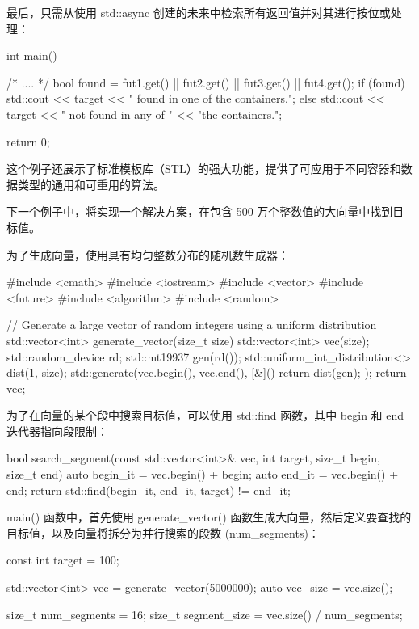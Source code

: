 最后，只需从使用 std::async 创建的未来中检索所有返回值并对其进行按位或处理：

\begin{cpp}
int main() {
    /* .... */
    bool found = fut1.get() || fut2.get() ||
    fut3.get() || fut4.get();
    if (found) {
        std::cout << target
                  << " found in one of the containers.\n";
    } else {
        std::cout << target
                  << " not found in any of "
                  << "the containers.\n";
    }

    return 0;
}
\end{cpp}

这个例子还展示了标准模板库（STL）的强大功能，提供了可应用于不同容器和数据类型的通用和可重用的算法。


下一个例子中，将实现一个解决方案，在包含 500 万个整数值的大向量中找到目标值。

为了生成向量，使用具有均匀整数分布的随机数生成器：

\begin{cpp}
#include <cmath>
#include <iostream>
#include <vector>
#include <future>
#include <algorithm>
#include <random>

// Generate a large vector of random integers using a uniform
distribution
std::vector<int> generate_vector(size_t size) {
    std::vector<int> vec(size);
    std::random_device rd;
    std::mt19937 gen(rd());
    std::uniform_int_distribution<> dist(1, size);
    std::generate(vec.begin(), vec.end(), [&]() {
        return dist(gen);
    });
    return vec;
}
\end{cpp}

为了在向量的某个段中搜索目标值，可以使用 std::find 函数，其中 begin 和 end 迭代器指向段限制：

\begin{cpp}
bool search_segment(const std::vector<int>& vec, int target, size_t
begin, size_t end) {
    auto begin_it = vec.begin() + begin;
    auto end_it = vec.begin() + end;
    return std::find(begin_it, end_it, target) != end_it;
}
\end{cpp}

main() 函数中，首先使用 generate\_vector() 函数生成大向量，然后定义要查找的目标值，以及向量将拆分为并行搜索的段数 (num\_segments)：

\begin{cpp}
const int target = 100;

std::vector<int> vec = generate_vector(5000000);
auto vec_size = vec.size();

size_t num_segments = 16;
size_t segment_size = vec.size() / num_segments;
\end{cpp}

